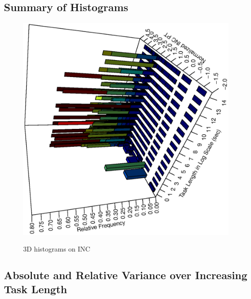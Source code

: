 \subsection{Summary of Histograms}

\begin{figure}[hp!]
\vspace{-.3in}
	\centering
	\includegraphics[scale=0.5,angle=270]{u_s_time/3d_plot.eps}\label{fig:3d_plot}
	\caption{3D histograms on INC~\label{fig:hist3d}}
\end{figure}

\subsection{Absolute and Relative Variance over Increasing Task Length}

